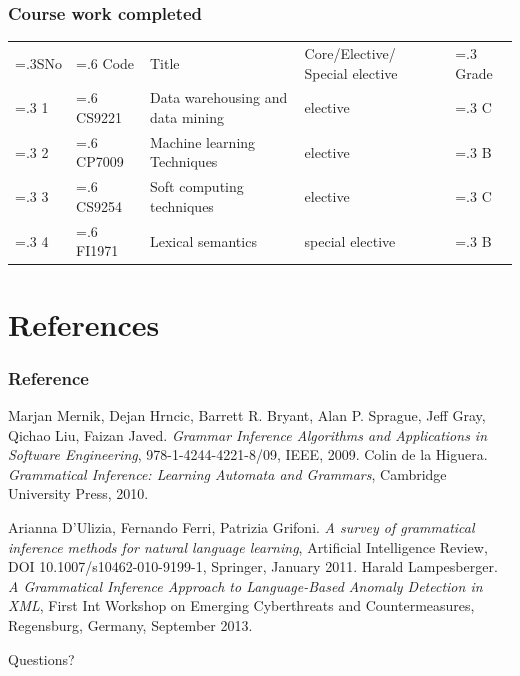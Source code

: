 \documentclass[11pt]{beamer}
\begin{document}
\begin{frame}
  \frametitle{Course work completed}
  \small
  \begin{tabularx}{1.0\linewidth}{
      >{\hsize=.3\hsize}X
      >{\hsize=.6\hsize}X
      >{\hsize=2.2\hsize}X
      >{\hsize=1.6\hsize}X
      >{\hsize=.3\hsize}X} 
    \rowcolor{LightRed}SNo & Code & Title & Core/Elective/ Special elective & Grade\\ 
    \rowcolor{LightBlue}   1 & CS9221 &  Data warehousing and data mining & elective & C\\
    \rowcolor{LightGreen}   2 & CP7009 & Machine learning Techniques & elective & B\\
    \rowcolor{LightBlue}   3 & CS9254 & Soft computing techniques & elective & C\\
    \rowcolor{LightGreen}   4 & FI1971 & Lexical semantics & special elective & B\\
  \end{tabularx}
\end{frame}

\section{References}

\begin{frame}[allowframebreaks]
  \frametitle<presentation>{Reference}
  \small
  \begin{thebibliography}{10}
    \beamertemplatebookbibitems
   Marjan Mernik, Dejan Hrncic, Barrett R. Bryant,
    Alan P. Sprague, Jeff Gray, Qichao Liu, Faizan Javed.
    \emph{Grammar Inference Algorithms and Applications in Software
      Engineering}, 978-1-4244-4221-8/09, IEEE, 2009.
   Colin de la Higuera.
    \emph{Grammatical Inference: Learning Automata and Grammars},
    Cambridge University Press, 2010.
 
    \beamertemplatearticlebibitems

   Arianna D'Ulizia, Fernando Ferri, Patrizia
    Grifoni.
    \emph{A survey of grammatical inference methods for natural
      language learning},
    Artificial Intelligence Review, DOI 10.1007/s10462-010-9199-1,
    Springer, January 2011.
   Harald Lampesberger. 
    \emph{A Grammatical Inference Approach to Language-Based Anomaly
      Detection in XML},
    First Int Workshop on Emerging Cyberthreats and Countermeasures,
    Regensburg, Germany, September 2013.
  \end{thebibliography}
\end{frame}

\begin{frame}
  \vfill
  \begin{center}
    Questions?
  \end{center}
  \vfill
  
\end{frame}
\end{document}
